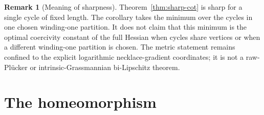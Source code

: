 \documentclass[11pt]{article}
\theoremstyle{definition}
\newtheorem{remark}[theorem]{Remark}
\begin{document}
\begin{remark}[Meaning of sharpness]
\label{rem:sharp-cycle-scope}
Theorem~\ref{thm:sharp-cot} is sharp for a single cycle of fixed length.
The corollary takes the minimum over the cycles in one chosen winding-one
partition.  It does not claim that this minimum is the optimal coercivity
constant of the full Hessian when cycles share vertices or when a different
winding-one partition is chosen.  The metric statement remains confined to
the explicit logarithmic necklace-gradient coordinates; it is not a
raw-Pl\"ucker or intrinsic-Grassmannian bi-Lipschitz theorem.
\end{remark}

\section{The homeomorphism}\label{sec:homeo}
\end{document}
